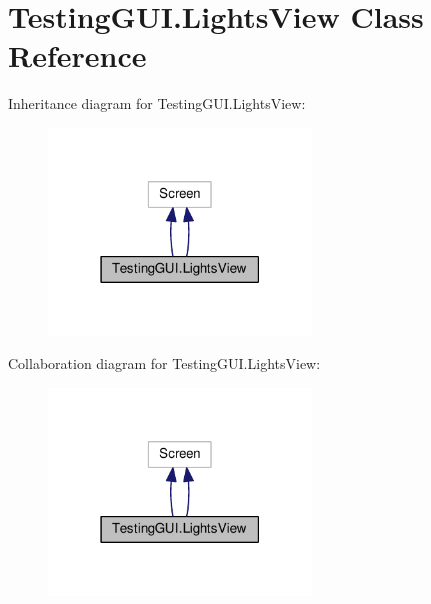 \hypertarget{classTestingGUI_1_1LightsView}{}\section{Testing\+G\+U\+I.\+Lights\+View Class Reference}
\label{classTestingGUI_1_1LightsView}


Inheritance diagram for Testing\+G\+U\+I.\+Lights\+View\+:\nopagebreak
\begin{figure}[H]
\begin{center}
\leavevmode
\includegraphics[width=198pt]{classTestingGUI_1_1LightsView__inherit__graph}
\end{center}
\end{figure}


Collaboration diagram for Testing\+G\+U\+I.\+Lights\+View\+:\nopagebreak
\begin{figure}[H]
\begin{center}
\leavevmode
\includegraphics[width=198pt]{classTestingGUI_1_1LightsView__coll__graph}
\end{center}
\end{figure}
